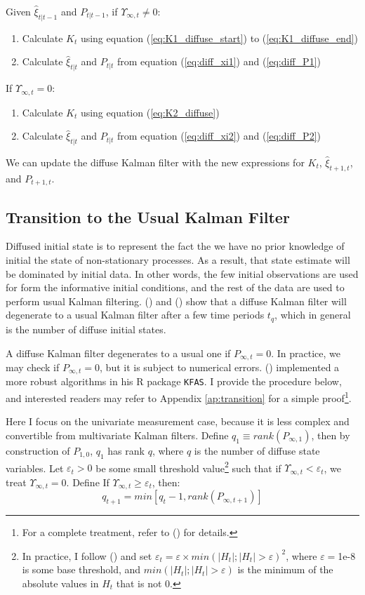 \documentclass[10pt, titlepage]{article}
\newenvironment{boenumerate}
    {\begin{enumerate}\renewcommand\labelenumi{\textbf\theenumi}}
    {\end{enumerate}}
\numberwithin{equation}{section}
\begin{document}
Given $\hat{\xi}_{t|t-1}$ and $P_{t|t-1}$, if $\Upsilon_{\infty,t}\neq 0$:
\begin{boenumerate}
    \item Calculate $K_t$ using equation (\ref{eq:K1_diffuse_start}) to (\ref{eq:K1_diffuse_end})
    \item Calculate $\hat{\xi}_{t|t}$ and $P_{t|t}$ from equation (\ref{eq:diff_xi1}) and (\ref{eq:diff_P1})
\end{boenumerate}

If $\Upsilon_{\infty,t}=0$:
\begin{boenumerate}
    \item Calculate $K_t$ using equation (\ref{eq:K2_diffuse})
    \item Calculate $\hat{\xi}_{t|t}$ and $P_{t|t}$ from equation (\ref{eq:diff_xi2}) and (\ref{eq:diff_P2})
\end{boenumerate}

We can update the diffuse Kalman filter with the new expressions for $K_t$, $\hat{\xi}_{t+1,t}$, and $P_{t+1,t}$.

\subsection{Transition to the Usual Kalman Filter}
Diffused initial state is to represent the fact the we have no prior knowledge of initial the state of non-stationary processes. As a result, that state estimate will be dominated by initial data. In other words, the few initial observations are used for form the informative initial conditions, and the rest of the data are used to perform usual Kalman filtering. (\cite{dejong_1991}) and (\cite{durbin_koopman_2003}) show that a diffuse Kalman filter will degenerate to a usual Kalman filter after a few time periods $t_q$, which in general is the number of diffuse initial states. 

A diffuse Kalman filter degenerates to a usual one if $P_{\infty,t}=0$. In practice, we may check if $P_{\infty,t}=0$, but it is subject to numerical errors. (\cite{helske_2016}) implemented a more robust algorithms in his R package \texttt{KFAS}. I provide the procedure below, and interested readers may refer to Appendix \ref{ap:transition} for a simple proof\footnote{For a complete treatment, refer to (\cite{koopman_1997}) for details.}. 

Here I focus on the univariate measurement case, because it is less complex and convertible from multivariate Kalman filters. Define $q_1\equiv rank(P_{\infty,1})$, then by construction of $P_{1,0}$, $q_1$ has rank $q$, where $q$ is the number of diffuse state variables. Let $\varepsilon_t>0$ be some small threshold value\footnote{In practice, I follow (\cite{helske_2016}) and set $\varepsilon_t=\varepsilon\times min(|H_t|;|H_t|>\varepsilon)^2$,  where $\varepsilon=$1e-8 is some base threshold, and $min(|H_t|;|H_t|>\varepsilon)$ is the minimum of the absolute values in $H_t$ that is not $0$.} such that if $\Upsilon_{\infty,t}<\varepsilon_t$, we treat $\Upsilon_{\infty,t}=0$. Define If $\Upsilon_{\infty,t}\geq \varepsilon_t$, then: 
\[
    q_{t+1}=min[q_t-1, rank(P_{\infty,t+1})]
\]
\end{document}
